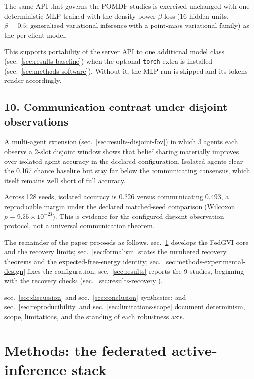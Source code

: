 \documentclass[
  english,
]{article}
\theoremstyle{plain}
\theoremstyle{definition}
\theoremstyle{remark}
\theoremstyle{definition}
\begin{document}
The same  API that governs the POMDP studies
is exercised unchanged with one deterministic MLP trained with the
density-power \(\beta\)-loss (16 hidden units, \(\beta=0.5\);
generalized variational inference with a point-mass variational family)
as the per-client model.

This supports portability of the server API to one additional model
class (sec.~\ref{sec:results-baseline}) when the optional \texttt{torch}
extra is installed (sec.~\ref{sec:methods-software}). Without it, the
MLP run is skipped and its tokens render accordingly.

\subsection{10. Communication contrast under disjoint
observations}\label{communication-contrast-under-disjoint-observations}

A multi-agent extension (sec.~\ref{sec:results-disjoint-fov}) in which 3
agents each observe a 2-slot disjoint window shows that belief sharing
materially improves over isolated-agent accuracy in the declared
configuration. Isolated agents clear the 0.167 chance baseline but stay
far below the communicating consensus, which itself remains well short
of full accuracy.

Across 128 seeds, isolated accuracy is 0.326 versus communicating 0.493,
a reproducible margin under the declared matched-seed comparison
(Wilcoxon \(p = 9.35 \times 10^{-23}\)). This is evidence for the
configured disjoint-observation protocol, not a universal communication
theorem.

The remainder of the paper proceeds as follows. sec.~\ref{sec:methods}
develops the FedGVI core and the recovery limits;
sec.~\ref{sec:formalism} states the numbered recovery theorems and the
expected-free-energy identity;
sec.~\ref{sec:methods-experimental-design} fixes the configuration;
sec.~\ref{sec:results} reports the 9 studies, beginning with the
recovery checks (sec.~\ref{sec:results-recovery}).

sec.~\ref{sec:discussion} and sec.~\ref{sec:conclusion} synthesize; and
sec.~\ref{sec:reproducibility} and sec.~\ref{sec:limitations-scope}
document determinism, scope, limitations, and the standing of each
robustness axis.

\section{Methods: the federated active-inference
stack}\label{sec:methods}
\end{document}
